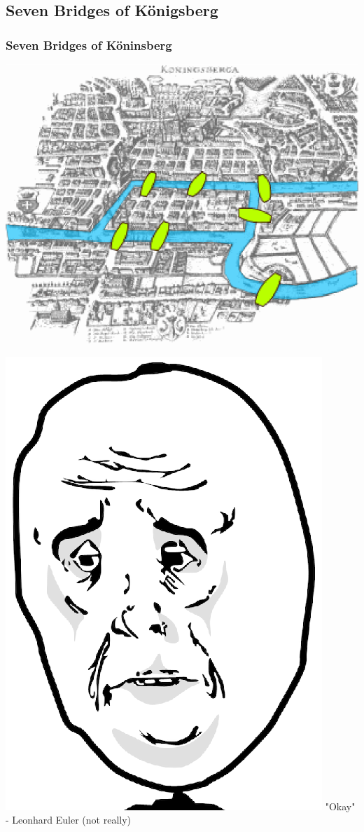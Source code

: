 \documentclass[article]{beamer}
\begin{document}
\subsection{Seven Bridges of K\"onigsberg}
\begin{frame}
	\frametitle{Seven Bridges of K\"oninsberg}
	\begin{center}
	\includegraphics[scale=0.8]{./figures/kon.eps}
	\end{center}
	
	\begin{flushright} 
	\includegraphics[scale=0.1]{./figures/okay.eps} "Okay" - Leonhard Euler \tiny (not really)
	\end{flushright}
	
\end{frame}
\end{document}
